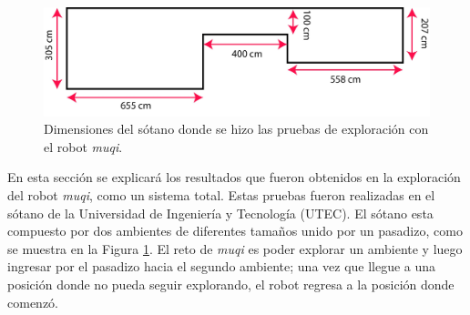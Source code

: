 \begin{figure}
  \centering \footnotesize
  \includegraphics[width=1.0\textwidth]{images/medidas_mapa.jpg}
  \captionsetup{font=footnotesize}
  \caption{Dimensiones del sótano donde se hizo las pruebas de exploración con 
  el robot \textit{muqi}.}
  \label{fig:DimensionesSotano}
\end{figure}

En esta sección se explicará los resultados que fueron obtenidos en la exploración 
del robot \textit{muqi}, como un sistema total. Estas pruebas fueron realizadas en
el sótano de la Universidad de Ingeniería y Tecnología (UTEC). El sótano esta 
compuesto por dos ambientes de diferentes tamaños unido por un pasadizo, como se 
muestra en la Figura \ref{fig:DimensionesSotano}. El reto de \textit{muqi} es poder 
explorar un ambiente y luego ingresar por el pasadizo hacia el segundo ambiente; una 
vez que llegue a una posición donde no pueda seguir explorando, el robot regresa a la 
posición donde comenzó.



